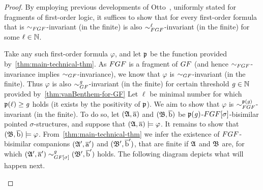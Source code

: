 \begin{proof}
By employing previous developments of Otto~\cite[Obs.~13]{Otto04}, uniformly stated for fragments of first-order logic, it suffices to show that for every first-order formula that is $\bisimto_{\FGF}$-invariant (in the finite) is also $\bisimto_{\FGF}^{\ell}$-invariant (in the finite) for some $\ell \in {\mathbb{N}}$.

Take any such first-order formula $\varphi$, and let $\mathfrak{p}$ be the function provided by~\cref{thm:main-technical-thm}.
As $\FGF$ is a fragment of $\GF$ (and hence $\bisimto_{\FGF}$-invariance implies $\bisimto_{\GF}$-invariance), we know that $\varphi$ is $\bisimto_{\GF}$-invariant (in the finite).
Thus $\varphi$ is also $\bisimto_{\GF}^{\mathit{g}}$-invariant (in the finite) for certain threshold $\mathit{g} \in {\mathbb{N}}$ provided by~\cref{thm:vanBenthem-for-GF}
Let $\ell$ be minimal number for which $\mathfrak{p}(\ell) \geq \mathit{g}$ holds (it exists by the positivity of $\mathfrak{p}$).
We aim to show that $\varphi$ is $\bisimto_{\FGF}^{\homop(\mathit{g})}$-invariant (in the finite).
To do so, let $({\mathfrak{A}}, \overline{\mathrm{a}})$ and $({\mathfrak{B}}, \overline{\mathrm{b}})$ be $\mathfrak{p}(\mathit{g})$-$\FGF[\sigma]$-bisimilar pointed $\sigma$-structures, and suppose that $({\mathfrak{A}}, \overline{\mathrm{a}}) \models \varphi$. It remains to show that $({\mathfrak{B}}, \overline{\mathrm{b}}) \models \varphi$.
From~\cref{thm:main-technical-thm} we infer the existence of $\FGF$-bisimilar companions $({\mathfrak{A}}', \overline{\mathrm{a}}')$ and $({\mathfrak{B}}', \overline{\mathrm{b}}')$, that are finite if ${\mathfrak{A}}$ and ${\mathfrak{B}}$ are, for which $(\str{A}', \elemtuplea') \bisimto^{\mathit{g}}_{\GF[\sigma]} (\str{B}', \elemtupleb')$ holds.
The following diagram depicts what will happen next.
\begin{figure}[H]
  \centering
\end{figure}
\end{proof}
